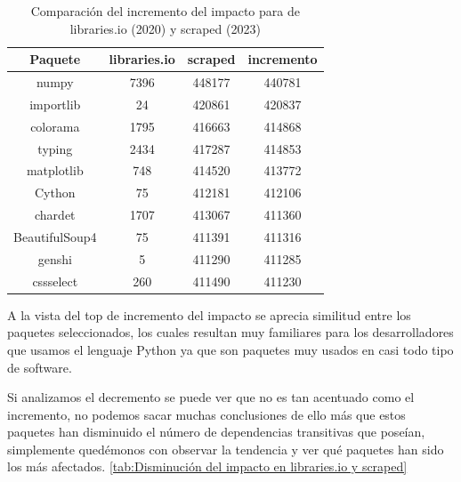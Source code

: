 \begin{table}[h!]
    \centering
    \caption{Comparación del incremento del impacto para de libraries.io (2020) y scraped (2023)}
    \begin{tabular}{|c|c|c|c|}
        \hline
        \textbf{Paquete} & \textbf{libraries.io} & \textbf{scraped} & \textbf{incremento} \\
        \hline
        numpy            & 7396                  & 448177           & 440781              \\
        importlib        & 24                    & 420861           & 420837              \\
        colorama         & 1795                  & 416663           & 414868              \\
        typing           & 2434                  & 417287           & 414853              \\
        matplotlib       & 748                   & 414520           & 413772              \\
        Cython           & 75                    & 412181           & 412106              \\
        chardet          & 1707                  & 413067           & 411360              \\
        BeautifulSoup4   & 75                    & 411391           & 411316              \\
        genshi           & 5                     & 411290           & 411285              \\
        cssselect        & 260                   & 411490           & 411230              \\
        \hline
    \end{tabular}
\end{table}


A la vista del top de incremento del impacto se aprecia similitud entre los paquetes seleccionados,
los cuales resultan muy familiares para los desarrolladores que usamos el lenguaje Python ya que
son paquetes muy usados en casi todo tipo de software.

Si analizamos el decremento se puede ver que no es tan acentuado como el incremento, no
podemos sacar muchas conclusiones de ello más que estos paquetes han disminuido el número de
dependencias transitivas que poseían, simplemente quedémonos con observar la tendencia y ver qué
paquetes han sido los más afectados. \ref{tab:Disminución del impacto en libraries.io y scraped}

